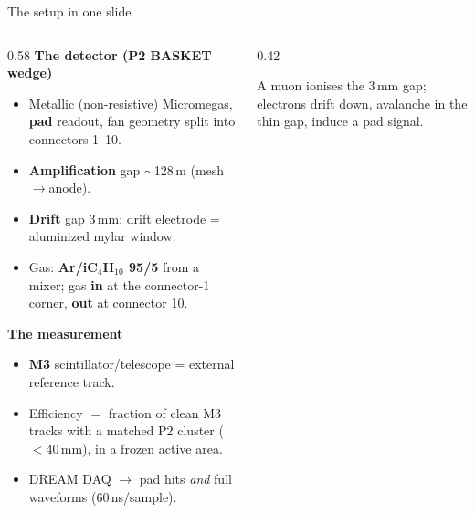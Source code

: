 \documentclass[10pt,aspectratio=169]{beamer}
\begin{document}
\begin{frame}{The setup in one slide}
\begin{columns}
\begin{column}{0.58\textwidth}
\textbf{The detector (P2 BASKET wedge)}
\begin{itemize}\footnotesize
  \item Metallic (non-resistive) Micromegas, \textbf{pad} readout, fan geometry
        split into connectors 1--10.
  \item \textbf{Amplification} gap $\sim$128\,\textmu m (mesh$\to$anode).
  \item \textbf{Drift} gap 3\,mm; drift electrode = aluminized mylar window.
  \item Gas: \textbf{Ar/iC$_4$H$_{10}$ 95/5} from a mixer; gas \textbf{in} at the
        connector-1 corner, \textbf{out} at connector 10.
\end{itemize}
\textbf{The measurement}
\begin{itemize}\footnotesize
  \item \textbf{M3} scintillator/telescope = external reference track.
  \item Efficiency $=$ fraction of clean M3 tracks with a matched P2 cluster
        ($<$40\,mm), in a frozen active area.
  \item DREAM DAQ $\to$ pad hits \emph{and} full waveforms (60\,ns/sample).
\end{itemize}
\end{column}
\begin{column}{0.42\textwidth}
\centering
{}
\vfill
\footnotesize A muon ionises the 3\,mm gap; electrons drift down, avalanche in
the thin gap, induce a pad signal.
\end{column}
\end{columns}
\end{frame}
\end{document}
